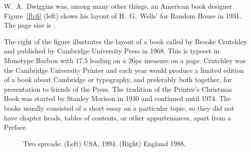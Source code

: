 \documentclass[10pt,a4paper,extrafontsizes]{memoir}
\begin{document}
\begin{paracol}{2}
\switchEng
    W.~A.~Dwiggins was, among many other things, an American book designer.
Figure~\ref{fb:6} (left) shows his layout of H.~G.~Wells'  for Random House in 1931. The page size is .

The right of the figure illustrates the layout of a book called 
by Brooke Crutchley 
and published by Cambridge University 
Press in 1968. This is typeset in 
Monotype Barbon
with $17.5$ leading on a $26$pc measure on a  page.
Crutchley was the Cambridge University 
Printer and each year would produce
a limited edition of a book about Cambridge or typography, and preferably
both together, for presentation to friends of the Press. The tradition of
the Printer's Christmas Book 
was started by Stanley 
Morison 
in 1930 and continued until 1974. The books usually consisted of a short 
essay on a
particular topic, so they did not have chapter heads, tables of contents,
or other appurtenances, apart from a Preface.
\end{paracol}


\begin{figure}
\centering
\begin{minipage}[b]{\pwlayi}
\end{minipage}
\hfill
\begin{minipage}[b]{\pwlayi}
\end{minipage}
\caption[Two spreads: USA, 1994 and England, 1988]%
        {Two spreads: (Left) USA, 1994.
         (Right) England 1988.} \label{fb:7}
\end{figure}
\end{document}
